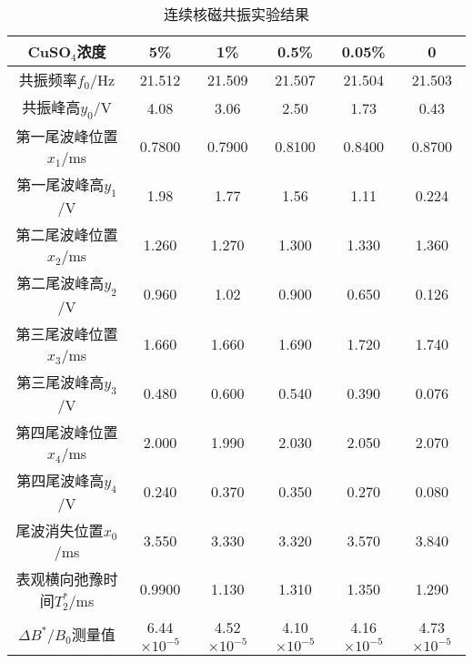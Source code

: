 \begin{table}[htbp!]
	\centering
	\caption{连续核磁共振实验结果}\label{tab:Continuous}	\begin{tabular}{c||c|c|c|c|c}
		\hline\hline
		CuSO$_4$浓度 & 5\% & 1\% & 0.5\% & 0.05\% & 0\\		\hline\hline
		共振频率$f_0$/Hz & 21.512 & 21.509 & 21.507 & 21.504 & 21.503\\		\hline
		共振峰高$y_0$/V & 4.08 & 3.06 & 2.50 & 1.73 & 0.43\\		\hline
		第一尾波峰位置$x_1$/ms & 0.7800 & 0.7900 & 0.8100 & 0.8400 & 0.8700\\		\hline
		第一尾波峰高$y_1$/V & 1.98 & 1.77 & 1.56 & 1.11 & 0.224\\		\hline
		第二尾波峰位置$x_2$/ms & 1.260 & 1.270 & 1.300 & 1.330 & 1.360\\		\hline
		第二尾波峰高$y_2$/V & 0.960 & 1.02 & 0.900 & 0.650 & 0.126\\		\hline
		第三尾波峰位置$x_3$/ms & 1.660 & 1.660 & 1.690 & 1.720 & 1.740\\		\hline
		第三尾波峰高$y_3$/V & 0.480 & 0.600 & 0.540 & 0.390 & 0.076\\		\hline
		第四尾波峰位置$x_4$/ms & 2.000 & 1.990 & 2.030 & 2.050 & 2.070\\		\hline
		第四尾波峰高$y_4$/V & 0.240 & 0.370 & 0.350 & 0.270 & 0.080\\		\hline
		尾波消失位置$x_0$/ms & 3.550 & 3.330 & 3.320 & 3.570 & 3.840\\		\hline
		表观横向弛豫时间$T^{*}_2$/ms & 0.9900 & 1.130 & 1.310 & 1.350 & 1.290\\		\hline
		$\Delta B^*/B_0$测量值 & 6.44$\times 10^{-5}$ & 4.52$\times 10^{-5}$ & 4.10$\times 10^{-5}$ & 4.16$\times 10^{-5}$ & 4.73$\times 10^{-5}$\\		\hline\hline
	\end{tabular}
\end{table}